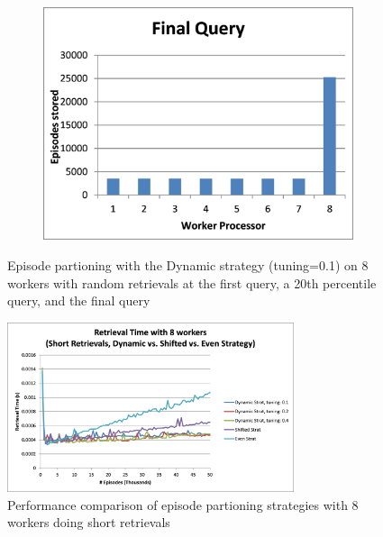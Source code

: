 \documentclass[11pt]{article} %
\begin{document}
\begin{figure}
\begin{subfigure}[b]{0.33\textwidth}
        \end{subfigure}%
        \begin{subfigure}[b]{0.33\textwidth}
                \centering
                \includegraphics[width=\textwidth]{images/randfinalquery}
                \label{fig:randdynam3}
        \end{subfigure}
        \caption{Episode partioning with the Dynamic strategy (tuning=0.1) on 8 workers with random retrievals at the first query, a 20th percentile query, and the final query}\label{fig:randdynam}
\end{figure}


\begin{figure}[h]
\caption{Performance comparison of episode partioning strategies with 8 workers doing short retrievals}\label{fig:shortdynamcomp}
\centering
\includegraphics[width=0.75\textwidth]{images/alldynamicshort}
\end{figure}
\end{document}
